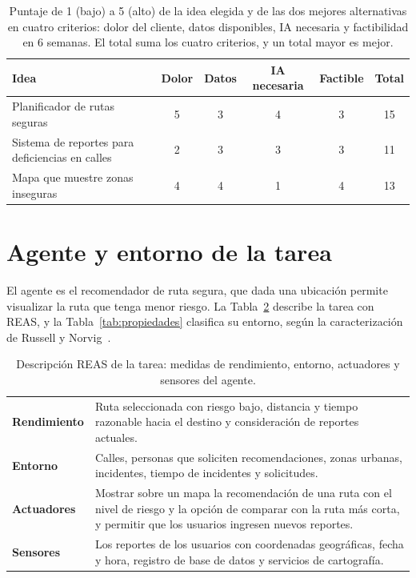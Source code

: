 \documentclass[11pt]{article}
\begin{document}
\begin{table}[H]
  \caption{Puntaje de 1 (bajo) a 5 (alto) de la idea elegida y de las dos mejores
    alternativas en cuatro criterios: dolor del cliente, datos disponibles, IA necesaria y
    factibilidad en 6 semanas. El total suma los cuatro criterios, y un total mayor es mejor.}
  \label{tab:seleccion}
  \begin{tabularx}{\textwidth}{@{}Xccccc@{}}
    \toprule
    Idea & Dolor & Datos & IA necesaria & Factible & Total \\
    \midrule
    Planificador de rutas seguras & 5 & 3 & 4 & 3 & 15 \\
    Sistema de reportes para deficiencias en calles & 2 & 3 & 3 & 3 & 11 \\
    Mapa que muestre zonas inseguras & 4 & 4 & 1 & 4 & 13 \\
    \bottomrule
  \end{tabularx}
\end{table}

\section{Agente y entorno de la tarea}
\label{sec:agente}

El agente es el recomendador de ruta segura, que dada una ubicación permite visualizar la ruta que
tenga menor riesgo. La Tabla~\ref{tab:reas} describe la tarea con REAS, y la
Tabla~\ref{tab:propiedades} clasifica su entorno, según la caracterización de Russell y
Norvig~\cite{russell2021}.

\begin{table}[H]
  \caption{Descripción REAS de la tarea: medidas de rendimiento, entorno, actuadores y
    sensores del agente.}
  \label{tab:reas}
  \renewcommand{\arraystretch}{1.25}
  \begin{tabularx}{\textwidth}{@{}>{\bfseries}p{}X@{}}
    \toprule
    Rendimiento & Ruta seleccionada con riesgo bajo, distancia y tiempo razonable hacia el destino
                  y consideración de reportes actuales. \\
    Entorno & Calles, personas que soliciten recomendaciones, zonas urbanas, incidentes, tiempo de
              incidentes y solicitudes. \\
    Actuadores & Mostrar sobre un mapa la recomendación de una ruta con el nivel de riesgo y la
                 opción de comparar con la ruta más corta, y permitir que los usuarios ingresen
                 nuevos reportes. \\
    Sensores & Los reportes de los usuarios con coordenadas geográficas, fecha y hora, registro de
               base de datos y servicios de cartografía. \\
    \bottomrule
  \end{tabularx}
\end{table}
\end{document}
